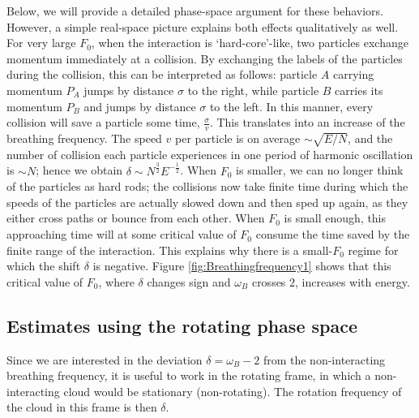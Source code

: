 \documentclass[onecolumn,pra]{revtex4-1}
\begin{document}
Below, we will provide a detailed phase-space argument for these behaviors.  However, a simple
real-space picture explains both effects qualitatively as well.  For very large $F_0$, when the
interaction is `hard-core'-like, two particles exchange momentum immediately at a collision.  By
exchanging the labels of the particles during the collision, this can be interpreted as follows:
particle $A$ carrying momentum $P_A$ jumps by distance $\sigma$ to the right, while particle $B$
carries its momentum $P_B$ and jumps by distance $\sigma$ to the left.  In this manner, every
collision will save a particle some time, $\frac{\sigma}{v}$.  This translates into an increase of
the breathing frequency.  The speed $v$ per particle is on average $\sim\sqrt{E/N}$, and the number
of collision each particle experiences in one period of harmonic oscillation is $\sim N$; hence we
obtain $\delta\sim N^{\frac{3}{2}}E^{-\frac{1}{2}}$.  When $F_0$ is smaller, we can no longer think
of the particles as hard rods; the collisions now take finite time during which the speeds of the
particles are actually slowed down and then sped up again, as they either cross paths or bounce from
each other.  When $F_0$ is small enough, this approaching time will at some critical value of $F_0$
consume the time saved by the finite range of the interaction.  This explains why there is a
small-$F_0$ regime for which the shift $\delta$ is negative.  Figure \ref{fig:Breathingfrequency1}
shows that this critical value of $F_0$, where $\delta$ changes sign and $\omega_B$ crosses $2$,
increases with energy.


\subsection{Estimates using the rotating phase space}

Since we are interested in the deviation $\delta=\omega_B-2$ from the non-interacting breathing
frequency, it is useful to work in the rotating frame, in which a non-interacting cloud would be
stationary (non-rotating).  The rotation frequency of the cloud in this frame is then $\delta$.
\end{document}
